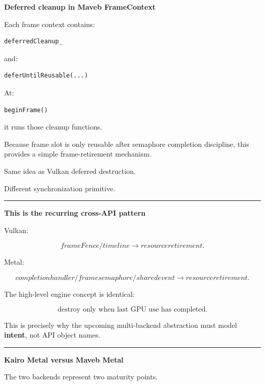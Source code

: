\textbf{Deferred cleanup in Maveb FrameContext}

Each frame context contains:

\begin{verbatim}
deferredCleanup_
\end{verbatim}

and:

\begin{verbatim}
deferUntilReusable(...)
\end{verbatim}

At:

\begin{verbatim}
beginFrame()
\end{verbatim}

it runs those cleanup functions.

Because frame slot is only reusable after semaphore completion discipline, this provides a simple frame-retirement mechanism.

Same idea as Vulkan deferred destruction.

Different synchronization primitive.

\begin{center}\rule{0.5\linewidth}{0.5pt}\end{center}

\textbf{This is the recurring cross-API pattern}

Vulkan:

\[
frameFence/timeline
\rightarrow
resource retirement.
\]

Metal:

\[
completion handler/frame semaphore/shared event
\rightarrow
resource retirement.
\]

The high-level engine concept is identical:

\[
\boxed{
\text{destroy only when last GPU use has completed}.
}
\]

This is precisely why the upcoming multi-backend abstraction must model \textbf{intent}, not API object names.

\begin{center}\rule{0.5\linewidth}{0.5pt}\end{center}

\textbf{Kairo Metal versus Maveb Metal}

The two backends represent two maturity points.

